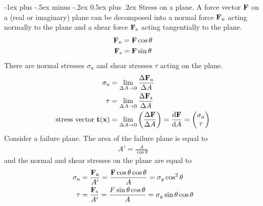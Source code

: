 \documentclass[10pt,landscape,a4paper]{article}
\makeatletter
\renewcommand\d{\mathop{}\!\mathrm{d}}
\renewcommand{\section}{\@startsection{section}{1}{0mm}%
	{-1ex plus -.5ex minus -.2ex}%
	{0.5ex plus .2ex}%
	{\normalfont\large\bfseries}}
\makeatother
\begin{document}
\begin{multicols}{3}
	\section{Stress on a plane.}
	A force vector $ \vb{F} $ on a (real or imaginary) plane can be decomposed into a normal force $ \vb{F}_\text{n} $ acting normally to the plane and a shear force $ \vb{F}_\text{s} $ acting tangentially to the plane.
	\begin{align*}
		\vb{F}_\text{n} & =\vb{F}\cos\theta  \\
		\vb{F}_\text{s} & =\vb{F}\sin\theta 
	\end{align*}
	There are normal stresses $ \sigma_\text{n} $ and shear stresses $ \tau $ acting on the plane.
	\begin{align*}
		\sigma_\text{n}                       & =\lim_{\Delta A\rightarrow0}\frac{\Delta\vb{F}_\text{n}}{\Delta A}                                                                              \\
		\tau                                  & =\lim_{\Delta A\rightarrow0}\frac{\Delta\vb{F}_\text{s}}{\Delta A}                                                                              \\
		\text{stress vector} \ \vb{t}(\vb{x}) & =\lim_{\Delta A\rightarrow0}\left(\frac{\Delta\vb{F}}{\Delta A}\right)=\frac{\vb{\d F}}{\d A}=\begin{pmatrix}\sigma_\text{n}\\\tau\end{pmatrix}
	\end{align*}
	Consider a failure plane. The area of the failure plane is equal to
	\begin{align*}
		A'=\frac{A}{\cos\theta}
	\end{align*}
	and the normal and shear stresses on the plane are equal to
	\begin{align*}
		\sigma_\text{n} & =\frac{\vb{F}_\text{n}}{A'}=\frac{\vb{F}\cos\theta\cos\theta}{A}=\sigma_y\cos^2\theta    \\
		\tau            & =\frac{\vb{F}_\text{s}}{A'}=\frac{F\sin\theta\cos\theta}{A}=\sigma_y\sin\theta\cos\theta
	\end{align*}
	

\end{multicols}
\end{document}
